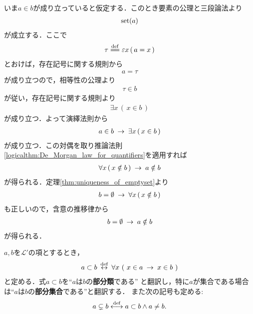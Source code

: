 	\begin{prf}
		いま$a \in b$が成り立っていると仮定する．このとき要素の公理と三段論法より
		\begin{align}
			\operatorname*{set} (a)
		\end{align}
		が成立する．ここで
		\begin{align}
			\tau \defeq \varepsilon x\, (\, a = x\, )
		\end{align}
		とおけば，存在記号に関する規則から
		\begin{align}
			a = \tau
		\end{align}
		が成り立つので，相等性の公理より
		\begin{align}
			\tau \in b
		\end{align}
		が従い，存在記号に関する規則より
		\begin{align}
			\exists x\, (\, x \in b\, )
		\end{align}
		が成り立つ．よって演繹法則から
		\begin{align}
			a \in b \hspace{0.25em}\rightarrow\hspace{0.25em} \exists x\, (\, x \in b\, )
		\end{align}
		が成り立つ．この対偶を取り推論法則\ref{logicalthm:De_Morgan_law_for_quantifiers}を適用すれば
		\begin{align}
			\forall x\, (\, x \notin b\, ) \hspace{0.25em}\rightarrow\hspace{0.25em} a \notin b
		\end{align}
		が得られる．定理\ref{thm:uniqueness_of_emptyset}より
		\begin{align}
			b = \emptyset \hspace{0.25em}\rightarrow\hspace{0.25em} \forall x\, (\, x \notin b\, )
		\end{align}
		も正しいので，含意の推移律から
		\begin{align}
			b = \emptyset \hspace{0.25em}\rightarrow\hspace{0.25em} a \notin b
		\end{align}
		が得られる．
		\QED
	\end{prf}
	
	\begin{screen}
		\begin{dfn}[部分類]
			$a,b$を$\mathcal{L}'$の項とするとき，
			\begin{align}
				a \subset b \overset{\mathrm{def}}{\hspace{0.25em}\leftrightarrow\hspace{0.25em}}
				\forall x\ (\ x \in a \hspace{0.25em}\rightarrow\hspace{0.25em} x \in b\ )
			\end{align}
			と定める．式$a \subset b$を``$a$は$b$の{\bf 部分類}である''
			と翻訳し，特に$a$が集合である場合は``$a$は$b$の{\bf 部分集合}である''と翻訳する．
			また次の記号も定める:
			\begin{align}
				a \subsetneq b \overset{\mathrm{def}}{\longleftrightarrow} a \subset b \wedge a \neq b.
			\end{align}
		\end{dfn}
	\end{screen}
	
